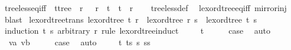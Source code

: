 \begin{isabellebody}
\endisatagproof
{\isafoldproof}%
%
\isadelimproof
\isanewline
%
\endisadelimproof
\isanewline
{}\isamarkupfalse%
\ tree{\isacharunderscore}{\kern0pt}less{\isacharunderscore}{\kern0pt}eq{\isacharunderscore}{\kern0pt}iff{\isacharcolon}{\kern0pt}\ {\isachardoublequoteopen}{\isasymnot}\ {\isacharparenleft}{\kern0pt}t{\isacharcolon}{\kern0pt}{\isacharcolon}{\kern0pt}tree{\isacharparenright}{\kern0pt}\ {\isacharless}{\kern0pt}\ r\ {\isasymand}\ {\isasymnot}\ r\ {\isacharless}{\kern0pt}\ t\ {\isasymlongleftrightarrow}\ t\ {\isacharequal}{\kern0pt}\ r{\isachardoublequoteclose}\isanewline
%
\isadelimproof
\ \ %
\endisadelimproof
%
\isatagproof
{}\isamarkupfalse%
\ tree{\isacharunderscore}{\kern0pt}less{\isacharunderscore}{\kern0pt}def\ \isamarkupfalse%
\ lexord{\isacharunderscore}{\kern0pt}tree{\isacharunderscore}{\kern0pt}eq{\isacharunderscore}{\kern0pt}iff\ mirror{\isacharunderscore}{\kern0pt}inj\ \isamarkupfalse%
\ blast%
\endisatagproof
{\isafoldproof}%
%
\isadelimproof
\isanewline
%
\endisadelimproof
\isanewline
{}\isamarkupfalse%
\ lexord{\isacharunderscore}{\kern0pt}tree{\isacharunderscore}{\kern0pt}trans{\isacharcolon}{\kern0pt}\ {\isachardoublequoteopen}lexord{\isacharunderscore}{\kern0pt}tree\ t\ r\ {\isasymLongrightarrow}\ lexord{\isacharunderscore}{\kern0pt}tree\ r\ s\ {\isasymLongrightarrow}\ lexord{\isacharunderscore}{\kern0pt}tree\ t\ s{\isachardoublequoteclose}\isanewline
%
\isadelimproof
%
\endisadelimproof
%
\isatagproof
{}\isamarkupfalse%
\ {\isacharparenleft}{\kern0pt}induction\ t\ s\ arbitrary{\isacharcolon}{\kern0pt}\ r\ rule{\isacharcolon}{\kern0pt}\ lexord{\isacharunderscore}{\kern0pt}tree{\isachardot}{\kern0pt}induct{\isacharparenright}{\kern0pt}\isanewline
\ \ \isamarkupfalse%
\ {\isacharparenleft}{\kern0pt}{}\ t{\isacharparenright}{\kern0pt}\isanewline
\ \ \isamarkupfalse%
\ \isamarkupfalse%
\ {\isacharquery}{\kern0pt}case\ \isamarkupfalse%
\ auto\isanewline
{}\isamarkupfalse%
\isanewline
\ \ \isamarkupfalse%
\ {\isacharparenleft}{\kern0pt}{}\ va\ vb{\isacharparenright}{\kern0pt}\isanewline
\ \ \isamarkupfalse%
\ \isamarkupfalse%
\ {\isacharquery}{\kern0pt}case\ \isamarkupfalse%
\ auto\isanewline
{}\isamarkupfalse%
\isanewline
\ \ \isamarkupfalse%
\ {\isacharparenleft}{\kern0pt}{}\ t\ ts\ s\ ss{\isacharparenright}{\kern0pt}\isanewline

\end{isabellebody}
